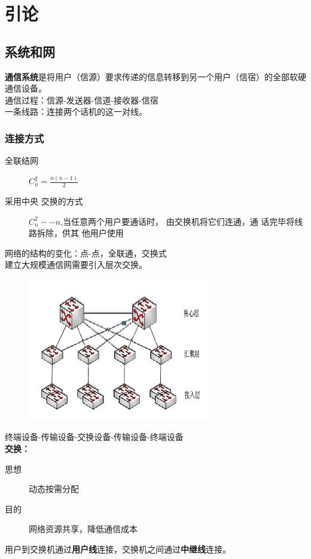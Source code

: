 \chapter{引论}
\section{系统和网}
\textbf{通信系统}是将用户（信源）要求传递的信息转移到另一个用户（信宿）的全部软硬通信设备。\\
通信过程：信源-发送器-信道-接收器-信宿\\
一条线路：连接两个话机的这一对线。
\subsection{连接方式}
\begin{description}
	\item[全联结网] $ C^2_n = \frac{n(n-1)}{2} $
	\item[采用中央 交换的方式] $ C^2_n -- n $,当任意两个用户要通话时，
	由交换机将它们连通，通
	话完毕将线路拆除，供其
	他用户使用
\end{description}
网络的结构的变化：点-点，全联通，交换式\\
建立大规模通信网需要引入层次交换。
\begin{figure}
	\centering
	\includegraphics[width=0.7\linewidth]{figures/screenshot019}
	\caption{}
	\label{fig:screenshot019}
\end{figure}
终端设备-传输设备-交换设备-传输设备-终端设备\\
\textbf{交换：}
\begin{description}
	\item[思想] 动态按需分配
	\item[目的] 网络资源共享，降低通信成本
\end{description}
用户到交换机通过\textbf{用户线}连接，交换机之间通过\textbf{中继线}连接。
